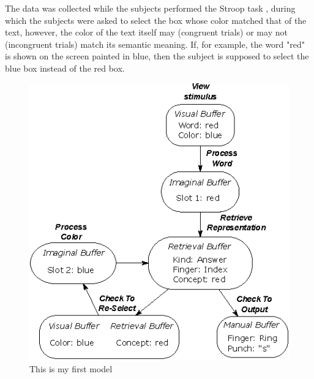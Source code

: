 \documentclass[10pt,letterpaper]{article}
\begin{document}
The data was collected while the subjects performed the Stroop task \cite{Stroop1935}, during which the subjects were asked to select the box whose color matched that of the text, however, the color of the text itself may (congruent trials) or may not (incongruent trials) match its semantic meaning. If, for example, the word "red" is shown on the screen painted in blue, then the subject is supposed to select the blue box instead of the red box.




\begin{figure}[ht]
\centering
  \includegraphics[width=\linewidth]{meaning_color_model.eps}
  \caption{This is my first model}
\end{figure}%
\end{document}
